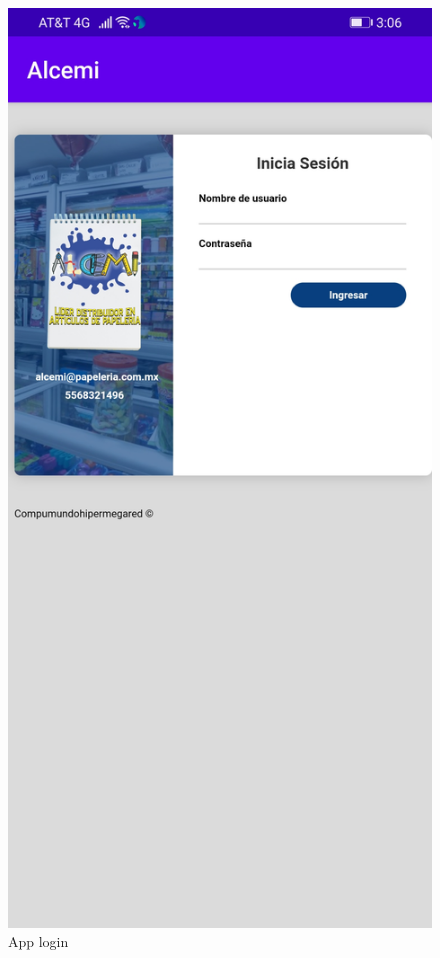 \documentclass{article}
\begin{document}
\begin{figure}[h]
\begin{minipage}[t]{0.5\linewidth}
\caption {App login}
\centering
\includegraphics[scale=0.16]{fig11}
\end{minipage}
\end{figure}
\end{document}
